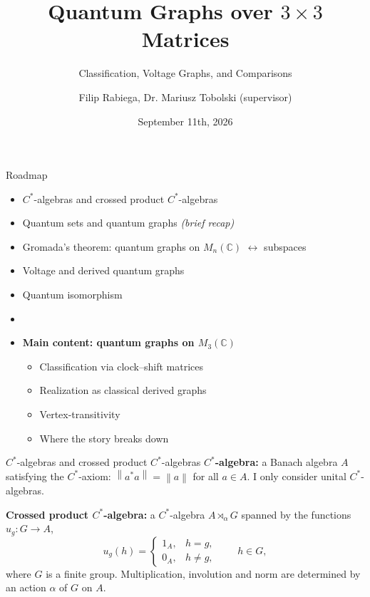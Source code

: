 \documentclass[aspectratio=169]{beamer}
\title{Quantum Graphs over $3\times 3$ Matrices}
\subtitle{Classification, Voltage Graphs, and Comparisons}
\author{Filip Rabiega, Dr. Mariusz Tobolski (supervisor)}
\date{September 11th, 2026}
\begin{document}
\begin{frame}
    \titlepage
\end{frame}

\begin{frame}{Roadmap}
    \begin{itemize}
        \item \(C^{*}\)-algebras and crossed product \(C^{*}\)-algebras
        \item Quantum sets and quantum graphs \hfill \emph{(brief recap)}
        \item Gromada's theorem: quantum graphs on $M_n(\mathbb{C})$
            $\leftrightarrow$ subspaces
        \item Voltage and derived quantum graphs
        \item Quantum isomorphism
        \item[]
        \item \textbf{Main content: quantum graphs on \( M_3 (\mathbb{C}) \)}
            \begin{itemize}
                \item Classification via clock--shift matrices
                \item Realization as classical derived graphs
                \item Vertex-transitivity
                \item Where the story breaks down
            \end{itemize}
    \end{itemize}
\end{frame}

\begin{frame}{\(C^{*}\)-algebras and crossed product \(C^{*}\)-algebras}
    \textbf{\(C^{*}\)-algebra:} a Banach algebra \( A \) satisfying
    the \(C^{*}\)-axiom: \( \left\| a^* a \right\| = \left\| a
    \right\| \) for all \( a \in A \). I only consider unital
    \(C^{*}\)-algebras.

    \vspace{0.5em}
    \textbf{Crossed product \(C^{*}\)-algebra:} a \(C^{*}\)-algebra
    \( A \rtimes_{\alpha} G \) spanned
    by the  functions \( u_g: G \rightarrow A \),
    \[
        u_g(h) =
        \begin{cases}
            1_A, & h = g, \\
            0_A, & h \neq g,
        \end{cases}
        \qquad h \in G,
    \]
    where \( G \) is a finite group. Multiplication, involution and norm are
    determined by an action \( \alpha \) of \( G \) on \( A \).
\end{frame}
\end{document}
